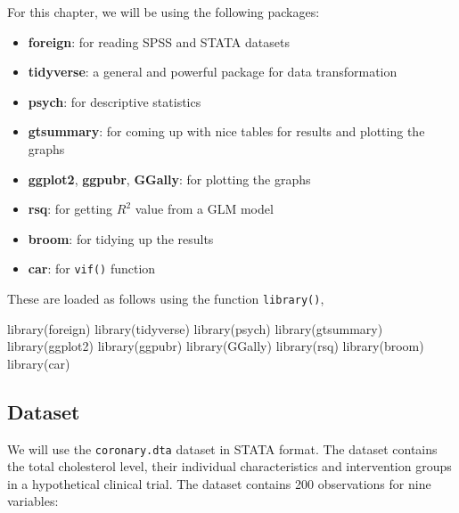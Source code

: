 \documentclass[
  10pt,
]{krantz}
\newenvironment{Shaded}{\begin{snugshade}}{\end{snugshade}}
\newcommand{\FunctionTok}[1]{\textcolor[rgb]{0.00,0.00,0.00}{#1}}
\newcommand{\NormalTok}[1]{#1}
\providecommand{\tightlist}{%
  \setlength{\itemsep}{0pt}\setlength{\parskip}{0pt}}
\begin{document}
For this chapter, we will be using the following packages:

\begin{itemize}
\tightlist
\item
  \textbf{foreign}: for reading SPSS and STATA datasets
\item
  \textbf{tidyverse}: a general and powerful package for data transformation
\item
  \textbf{psych}: for descriptive statistics
\item
  \textbf{gtsummary}: for coming up with nice tables for results and plotting the graphs
\item
  \textbf{ggplot2}, \textbf{ggpubr}, \textbf{GGally}: for plotting the graphs
\item
  \textbf{rsq}: for getting \(R^2\) value from a GLM model
\item
  \textbf{broom}: for tidying up the results
\item
  \textbf{car}: for \texttt{vif()} function
\end{itemize}

These are loaded as follows using the function \texttt{library()},

\begin{Shaded}
\begin{Highlighting}[]
\FunctionTok{library}\NormalTok{(foreign)}
\FunctionTok{library}\NormalTok{(tidyverse)}
\FunctionTok{library}\NormalTok{(psych)}
\FunctionTok{library}\NormalTok{(gtsummary)}
\FunctionTok{library}\NormalTok{(ggplot2)}
\FunctionTok{library}\NormalTok{(ggpubr)}
\FunctionTok{library}\NormalTok{(GGally)}
\FunctionTok{library}\NormalTok{(rsq)}
\FunctionTok{library}\NormalTok{(broom)}
\FunctionTok{library}\NormalTok{(car)}
\end{Highlighting}
\end{Shaded}

\hypertarget{dataset}{%
\subsection{Dataset}\label{dataset}}

We will use the \texttt{coronary.dta} dataset in STATA format. The dataset contains the total cholesterol level, their individual characteristics and intervention groups in a hypothetical clinical trial. The dataset contains 200 observations for nine variables:
\end{document}
